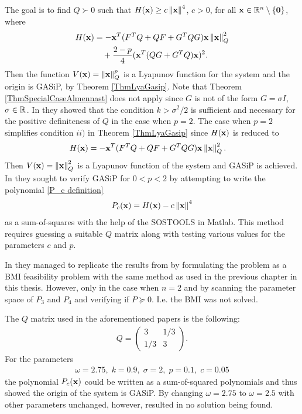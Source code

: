 \documentclass[a4paper,12pt,twoside,BCOR=10mm]{scrbook}
\begin{document}
The goal is to find $Q \succ 0$ such that $H(\mathbf{x}) \geq c\left\lVert\mathbf{x}\right\rVert^4$, $c > 0$, for all $\mathbf{x} \in \mathbb{R}^{n} \setminus \{\mathbf{0}\}$, where
\begin{align*}
\begin{split}
    H(\mathbf{x}) &= -\mathbf{x}^T (F^T Q + QF + G^TQG) \mathbf{x}\left\lVert\mathbf{x}\right\rVert_{Q}^{2}\\
    &\quad+ \frac{2 - p}{4} (\mathbf{x}^T (QG + G^TQ)\mathbf{x})^2.
\end{split}
\end{align*}
Then the function $V(\mathbf{x}) = \left\lVert\mathbf{x}\right\rVert_Q^p$ is a Lyapunov function for the system and the origin is GASiP, by Theorem \ref{ThmLyaGasip}. Note that Theorem \ref{ThmSpecialCaseAlmennast} does not apply since $G$ is not of the form $G = \sigma I$, $\sigma \in \mathbb{R}^{}$.
In \citep{sdestab2012khaminskii} they showed that the condition $k > \sigma^2 / 2$ is sufficient and necessary for the positive definiteness of $Q$ in the case when $p = 2$. The case when $p = 2$ simplifies condition $ii)$ in Theorem \ref{ThmLyaGasip} since $H(\mathbf{x})$ is reduced to
\begin{align*}
    H(\mathbf{x}) &= -\mathbf{x}^T (F^T Q + QF + G^TQG)\mathbf{x}\left\lVert\mathbf{x}\right\rVert_{Q}^{2}.
\end{align*}
Then $V(\mathbf{x}) = \left\lVert\mathbf{x}\right\rVert_{Q}^{2}$ is a Lyapunov function of the system and GASiP is achieved. In \citep{HGGS2018localLya} they sought to verify GASiP for $0 < p < 2$ by attempting to write the polynomial \eqref{P_c definition}
\begin{align*}
    P_c(\mathbf{x}) = H(\mathbf{x}) - c\left\lVert\mathbf{x}\right\rVert_{}^{4}
\end{align*}
as a sum-of-squares with the help of the SOSTOOLS in Matlab. This method requires guessing a suitable $Q$ matrix along with testing various values for the parameters $c$ and $p$.

In \citep{Ha2019BMI} they managed to replicate the results from \citep{HGGS2018localLya} by formulating the problem as a BMI feasibility problem with the same method as used in the previous chapter in this thesis. However, only in the case when $n = 2$ and by scanning the parameter space of $P_3$ and $P_4$ and verifying if $P \succeq 0$. I.e. the BMI was not solved.

The $Q$ matrix used in the aforementioned papers is the following:
\begin{align*}
    Q = \begin{pmatrix}
    3 & 1/3\\
    1/3 & 3
    \end{pmatrix}.
\end{align*}
For the parameters
\begin{align*}
    \omega = 2.75,\; k = 0.9, \; \sigma = 2, \; p = 0.1 , \; c = 0.05
\end{align*}
the polynomial $P_c(\mathbf{x})$ could be written as a sum-of-squared polynomials and thus showed the origin of the system is GASiP. By changing $\omega = 2.75$ to $\omega = 2.5$ with other parameters unchanged, however, resulted in no solution being found.
\end{document}
